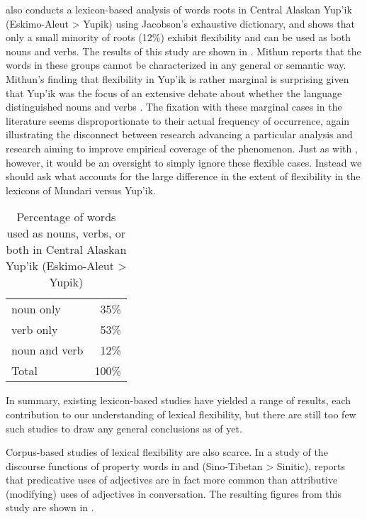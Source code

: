 \textcite[163]{Mithun2017} also conducts a lexicon-based analysis of words roots in Central Alaskan Yup'ik (Eskimo-Aleut > Yupik) using Jacobson's \parencite*{Jacobson2012} exhaustive dictionary, and shows that only a small minority of roots (12\%) exhibit flexibility and can be used as both nouns and verbs. The results of this study are shown in . Mithun reports that the words in these groups cannot be characterized in any general or semantic way. Mithun's finding that flexibility in Yup'ik is rather marginal is surprising given that Yup'ik was the focus of an extensive debate about whether the language distinguished nouns and verbs \parencite{Sadock1999}. The fixation with these marginal cases in the literature seems disproportionate to their actual frequency of occurrence, again illustrating the disconnect between research advancing a particular analysis and research aiming to improve empirical coverage of the phenomenon. Just as with , however, it would be an oversight to simply ignore these flexible cases. Instead we should ask what accounts for the large difference in the extent of flexibility in the lexicons of Mundari versus Yup'ik.

\begin{table}[h]
  \centering
  \caption[Percentage of words used as nouns, verbs, or both in Central Alaskan Yup'ik (Eskimo-Aleut > Yupik)]{Percentage of words used as nouns, verbs, or both in Central Alaskan Yup'ik (Eskimo-Aleut > Yupik) \parencite[163]{Mithun2017}}
  \label{tab:Mithun-2017}
  \begin{tabular}{ l r }
    \toprule
    noun only     &  35\% \\
    verb only     &  53\% \\
    noun and verb &  12\% \\
    \midrule
    Total         & 100\% \\
    \bottomrule
  \end{tabular}
\end{table}

In summary, existing lexicon-based studies have yielded a range of results, each contribution to our understanding of lexical flexibility, but there are still too few such studies to draw any general conclusions as of yet.

Corpus-based studies of lexical flexibility are also scarce. In a study of the discourse functions of property words in  and  (Sino-Tibetan > Sinitic), \textcite{Thompson1989} reports that predicative uses of adjectives are in fact more common than attributive (modifying) uses of adjectives in conversation. The resulting figures from this study are shown in .

